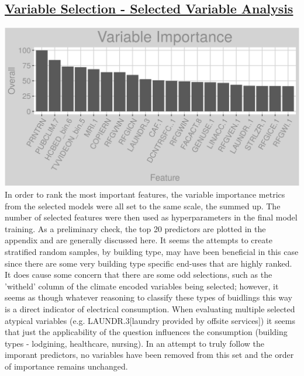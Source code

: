 \subsection{\hyperref[appendix:electricity:sv]{Variable Selection - Selected Variable Analysis}}

\includegraphics[width=.99\textwidth, height=0.35\textheight]{Images/electricity_all_vars.png}
\\[0.2in]
In order to rank the most important features, the variable importance metrics from the selected models were all set to the same scale, the summed up.  The number of selected features were then used as hyperparameters in the final model training.  As a preliminary check, the top 20 predictors are plotted in the appendix and are generally discussed here.  It seems the attempts to create stratified random samples, by building type, may have been beneficial in this case since there are some very building type specific end-uses that are highly ranked.  It does cause some concern that there are some odd selections, such as the 'witheld' column of the climate encoded variables being selected; however, it seems as though whatever reasoning to classify these types of buidlings this way is a direct indicator of electrical consumption.  When evaluating multiple selected atypical variables (e.g. LAUNDR.3[laundry provided by offsite services]) it seems that just the applicability of the question influences the consumption (building types - lodgining, healthcare, nursing).  In an attempt to truly follow the imporant predictors, no variables have been removed from this set and the order of importance remains unchanged.